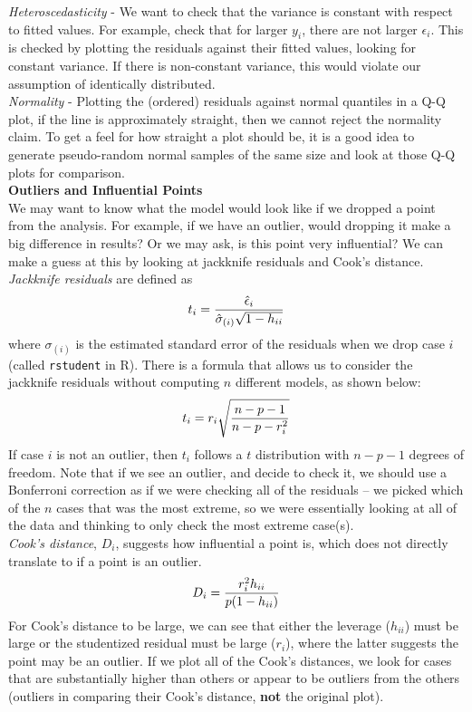 \documentclass[11pt]{article}
\begin{document}
\noindent \textit{Heteroscedasticity} - We want to check that the variance is constant with respect to fitted values. For example, check that for larger $y_i$, there are not larger $\epsilon_i$. This is checked by plotting the residuals against their fitted values, looking for constant variance. If there is non-constant variance, this would violate our assumption of identically distributed. \\

\noindent \textit{Normality} - Plotting the (ordered) residuals against normal quantiles in a Q-Q plot, if the line is approximately straight, then we cannot reject the normality claim. To get a feel for how straight a plot should be, it is a good idea to generate pseudo-random normal samples of the same size and look at those Q-Q plots for comparison. \\

\noindent\textbf{Outliers and Influential Points}  \\

We may want to know what the model would look like if we dropped a point from the analysis. For example, if we have an outlier, would dropping it make a big difference in results? Or we may ask, is this point very influential? We can make a guess at this by looking at jackknife residuals and Cook's distance. \textit{Jackknife residuals} are defined as
\begin{eqnarray}
t_i = \frac{\hat{\epsilon}_i}{\hat{\sigma}_{(i)}\sqrt{1-h_{ii}}} \notag
\end{eqnarray}
where $\sigma_{(i)}$ is the estimated standard error of the residuals when we drop case $i$ (called \texttt{rstudent} in R). There is a formula that allows us to consider the jackknife residuals without computing $n$ different models, as shown below:
\begin{eqnarray}
t_i = r_i\sqrt{\frac{n-p-1}{n-p-r_i^2}} \notag
\end{eqnarray}
If case $i$ is not an outlier, then $t_i$ follows a $t$ distribution with $n-p-1$ degrees of freedom. Note that if we see an outlier, and decide to check it, we should use a Bonferroni correction as if we were checking all of the residuals -- we picked which of the $n$ cases that was the most extreme, so we were essentially looking at all of the data and thinking to only check the most extreme case(s). \\

\textit{Cook's distance}, $D_i$, suggests how influential a point is, which does not directly translate to if a point is an outlier.
\begin{eqnarray}
D_i = \frac{r_i^2 h_{ii}}{p(1-h_{ii})} \notag
\end{eqnarray}
For Cook's distance to be large, we can see that either the leverage ($h_{ii}$) must be large or the studentized residual must be large ($r_i$), where the latter suggests the point may be an outlier. If we plot all of the Cook's distances, we look for cases that are substantially higher than others or appear to be outliers from the others (outliers in comparing their Cook's distance, \textbf{not} the original plot).
\end{document}
